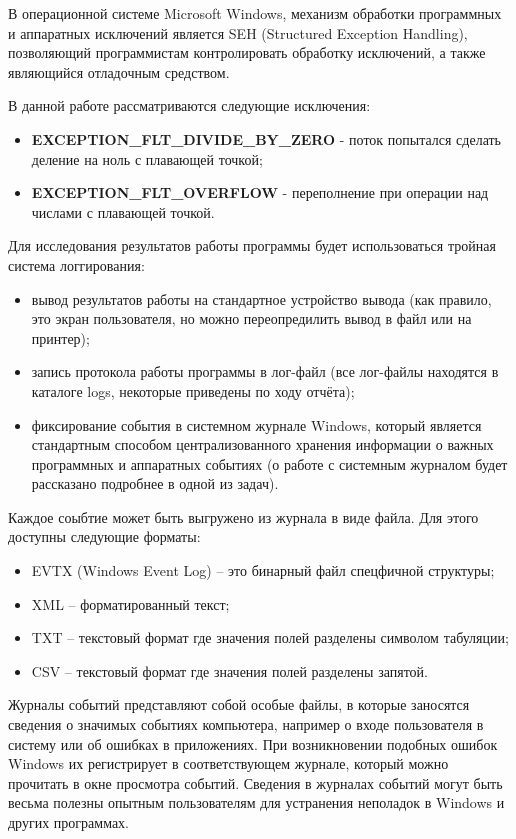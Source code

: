 \documentclass[a4paper, 12pt]{report}		%
\begin{document}
В операционной системе Microsoft Windows, механизм обработки программных и аппаратных исключений является SEH (Structured Exception Handling), позволяющий программистам контролировать обработку исключений, а также являющийся отладочным средством.

\vspace{1em}
В данной работе рассматриваются следующие исключения:
\begin{itemize}
\item \textbf{EXCEPTION\_FLT\_DIVIDE\_BY\_ZERO} - поток попытался сделать деление на ноль с плавающей точкой;
\item \textbf{EXCEPTION\_FLT\_OVERFLOW} - переполнение при операции над числами с плавающей точкой.
\end{itemize}

Для исследования результатов работы программы будет использоваться тройная система логгирования:
\begin{itemize}
\item вывод результатов работы на стандартное устройство вывода (как правило, это экран пользователя, но можно переопредилить вывод в файл или на принтер);
\item запись протокола работы программы в лог-файл (все лог-файлы находятся в каталоге logs, некоторые приведены по ходу отчёта);
\item фиксирование события в системном журнале Windows, который является стандартным способом централизованного хранения информации о важных программных и аппаратных событиях (о работе с системным журналом будет рассказано подробнее в одной из задач).
\end{itemize}

Каждое соыбтие может быть выгружено из журнала в виде файла. Для этого доступны следующие форматы:
\begin{itemize}
\item EVTX (Windows Event Log) -- это бинарный файл спецфичной структуры;
\item XML -- форматированный текст;
\item TXT -- текстовый формат где значения полей разделены символом табуляции;
\item CSV -- текстовый формат где значения полей разделены запятой.
\end{itemize}

Журналы событий представляют собой особые файлы, в которые заносятся сведения о значимых событиях компьютера, например о входе пользователя в систему или об ошибках в приложениях. При возникновении подобных ошибок Windows их регистрирует в соответствующем журнале, который можно прочитать в окне просмотра событий. Сведения в журналах событий могут быть весьма полезны опытным пользователям для устранения неполадок в Windows и других программах.
\end{document}
